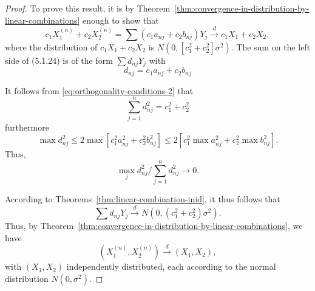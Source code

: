 \begin{proof}
	To prove this result, it is by Theorem~\ref{thm:convergence-in-distribution-by-linear-combinations} enough to show that
	\begin{equation*}
		c_{1} X_{1}^{(n)}+c_{2} X_{2}^{(n)}=\sum\left(c_{1} a_{nj}+c_{2} b_{nj}\right) Y_{j} \stackrel{d}{\rightarrow}c_{1} X_{1}+c_{2} X_{2},
	\end{equation*}
	where the distribution of $c_{1} X_{1}+c_{2} X_{2}$ is $N\left(0,\left[c_{1}^2+c_{2}^2\right] \sigma^2\right)$. The sum on the left side of (5.1.24) is of the form $\sum d_{nj} Y_{j}$ with
	\begin{equation*}
		d_{nj}=c_{1} a_{nj}+c_{2} b_{nj}
	\end{equation*}

	It follows from \eqref{eq:orthogonality-conditions-2} that
	\begin{equation*}
		\sum_{j=1}^{n}d_{nj}^2=c_{1}^2+c_{2}^2
	\end{equation*}
	furthermore
	\begin{equation*}
		\max d_{nj}^2\leq 2\max\left[c_{1}^2a_{nj}^2+c_{2}^2 b_{nj}^2\right]\leq 2\left[c_{1}^2 \max a_{nj}^2+c_{2}^2\max b_{nj}^2\right].
	\end{equation*}
	Thus,
	\begin{equation*}
		\max_{j}d_{nj}^{2}/\sum_{j=1}^{n}d_{nj}^{2}\rightarrow 0.
	\end{equation*}

	According to Theorems~\ref{thm:linear-combination-inid}, it thus follows that
	\begin{equation*}
		\sum d_{nj} Y_{j} \stackrel{d}{\rightarrow}N\left(0,\left(c_{1}^2+c_{2}^2\right) \sigma^2\right).
	\end{equation*}
	Thus, by Theorem~\ref{thm:convergence-in-distribution-by-linear-combinations}, we have
	\begin{equation*}
		(X_{1}^{(n)},X_{2}^{(n)})\stackrel{d}{\rightarrow}(X_{1},X_{2}),
	\end{equation*}
	with $(X_{1},X_{2})$ independently distributed, each according to the normal distribution $N\left(0,\sigma^2\right)$.
\end{proof}

